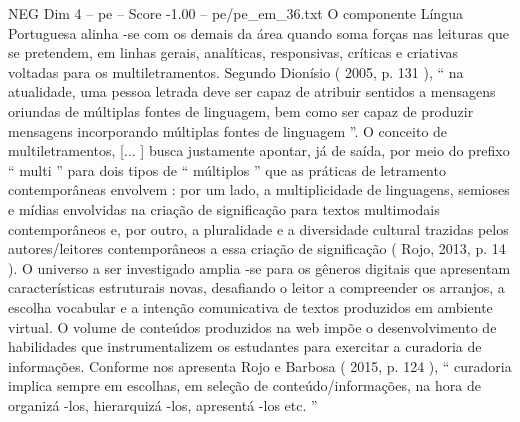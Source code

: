 \begin{textsample}{NEG Dim 4 – pe – Score -1.00 – pe/pe\_em\_36.txt}
O componente Língua Portuguesa alinha -se com os demais da área quando soma forças nas leituras que se pretendem, em linhas gerais, analíticas, responsivas, críticas e criativas voltadas para os multiletramentos.
Segundo Dionísio ( 2005, p. 131 ), “ na atualidade, uma pessoa letrada deve ser capaz de atribuir sentidos a mensagens oriundas de múltiplas fontes de linguagem, bem como ser capaz de produzir mensagens incorporando múltiplas fontes de linguagem ”.
O conceito de multiletramentos, [... ] busca justamente apontar, já de saída, por meio do prefixo “ multi ” para dois tipos de “ múltiplos ” que as práticas de letramento contemporâneas envolvem : por um lado, a multiplicidade de linguagens, semioses e mídias envolvidas na criação de significação para textos multimodais contemporâneos e, por outro, a pluralidade e a diversidade cultural trazidas pelos autores/leitores contemporâneos a essa criação de significação ( Rojo, 2013, p. 14 ).
O universo a ser investigado amplia -se para os gêneros digitais que apresentam características estruturais novas, desafiando o leitor a compreender os arranjos, a escolha vocabular e a intenção comunicativa de textos produzidos em ambiente virtual.
O volume de conteúdos produzidos na web impõe o desenvolvimento de habilidades que instrumentalizem os estudantes para exercitar a curadoria de informações.
Conforme nos apresenta Rojo e Barbosa ( 2015, p. 124 ), “ curadoria implica sempre em escolhas, em seleção de conteúdo/informações, na hora de organizá -los, hierarquizá -los, apresentá -los etc. ”

\end{textsample}

